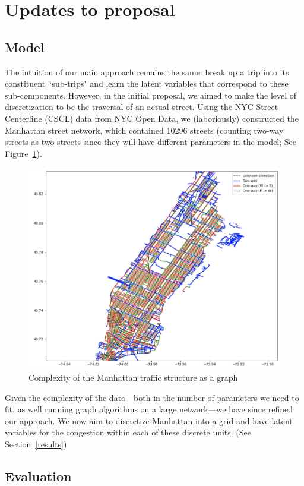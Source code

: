 \documentclass[11pt]{article}
\begin{document}
\section{Updates to proposal}

\subsection{Model}

The intuition of our main approach remains the same: break up a trip into its constituent ``sub-trips" and learn the latent variables that correspond to these sub-components. However, in the initial proposal, we aimed to make the level of discretization to be the traversal of an actual street. Using the NYC Street Centerline (CSCL) data from NYC Open Data, we (laboriously) constructed the Manhattan street network, which contained 10296 streets (counting two-way streets as two streets since they will have different parameters in the model; See Figure~\ref{manhattan}).
\begin{figure}
\centering
    \includegraphics[width=0.7\linewidth]{network.png}
    \caption{Complexity of the Manhattan traffic structure as a graph}
    \label{manhattan}
\end{figure}
Given the complexity of the data---both in the number of parameters we need to fit, as well running graph algorithms on a large network---we have since refined our approach. We now aim to discretize Manhattan into a grid and have latent variables for the congestion within each of these discrete units. (See Section~\ref{results})

\subsection{Evaluation}
\end{document}
